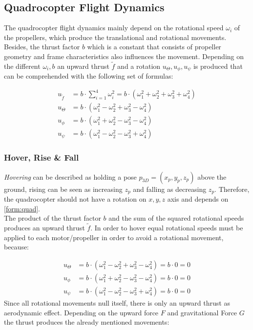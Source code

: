 \newpage 


\subsection{Quadrocopter Flight Dynamics}
The quadrocopter flight dynamics mainly depend on the rotational speed $\omega_i$ of the propellers, 
which produce the translational and rotational movements. 
Besides, the thrust factor $b$ which is a constant that consists of propeller geometry and frame characteristics also influences the movement. 
Depending on the different $\omega_i, b$ an upward thrust $\tilde{f}$ and a rotation $u_{\Theta}, u_{\phi}, u_{\psi}$ is produced 
that can be comprehended with the following set of formulas:

\begin{align}
	u_{\tilde{f}} &= b \cdot \sum_{i=1}^{4}\omega_i^2 = b \cdot ( \omega_1^2 + \omega_2^2 + \omega_3^2 + \omega_4^2)\label{form:quad}\\
	u_{\Theta} &= b \cdot (\omega_1^2 - \omega_2^2 + \omega_3^2 - \omega_4^2) \label{form:quad2}\\
	u_{\phi} &= b \cdot (\omega_1^2 + \omega_2^2 - \omega_3^2 - \omega_4^2)\label{form:quad3}\\
	u_{\psi} &= b \cdot (\omega_1^2 - \omega_2^2 - \omega_3^2 + \omega_4^2)\label{form:quad4}
\end{align}

\subsubsection{Hover, Rise \& Fall} \label{sec:hover}
\emph{Hovering} can be described as holding a pose $p_{3D} = (x_p, y_p, z_p)$ above the ground, 
rising can be seen as increasing $z_p$ and falling as decreasing $z_p$. 
Therefore, the quadrocopter should not have a rotation on $x,y,z$ axis and depends on \cref{form:quad}.  \\
The product of the thrust factor $b$ and the sum of the squared rotational speeds produces an upward thrust $\tilde{f}$. 
In order to hover equal rotational speeds must be applied to each motor/propeller in order to avoid a rotational movement, because:

\begin{align}
	u_{\Theta} &= b \cdot (\omega_1^2 - \omega_2^2 + \omega_3^2 - \omega_4^2) = b \cdot 0 = 0\\
	u_{\phi} &= b \cdot (\omega_1^2 + \omega_2^2 - \omega_3^2 - \omega_4^2) = b \cdot 0 = 0\\
	u_{\psi} &= b \cdot (\omega_1^2 - \omega_2^2 - \omega_3^2 + \omega_4^2)	= b \cdot 0 = 0
\end{align}
Since all rotational movements null itself, there is only an upward thrust as aerodynamic effect.
Depending on the upward force $F$ and gravitational Force $G$ the thrust produces the already mentioned movements:

